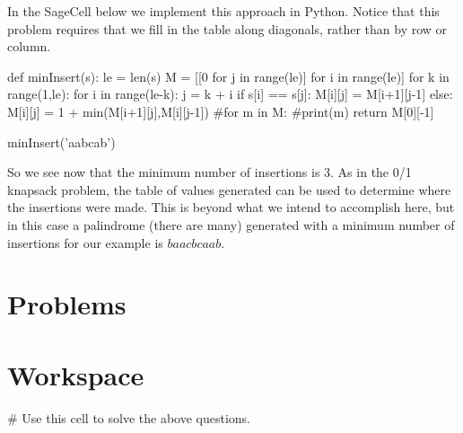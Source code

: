 \documentclass{ximera}
\begin{document}
In the SageCell below we implement this approach in Python. Notice that this problem requires that we fill in the table along diagonals, rather than by row or column.

\begin{sageCell}
def minInsert(s):
        le = len(s)
        M = [[0 for j in range(le)] for i in range(le)]
        for k in range(1,le):
                for i in range(le-k):
                        j = k + i
                        if s[i] == s[j]:
                                M[i][j] = M[i+1][j-1]
                        else:
                                M[i][j] = 1 + min(M[i+1][j],M[i][j-1])
        #for m in M:
                #print(m)
        return M[0][-1]

minInsert('aabcab')
\end{sageCell}

So we see now that the minimum number of insertions is 3. As in the 0/1 knapsack problem, the table of values generated can be used to determine where the insertions were made. This is beyond what we intend to accomplish here, but in this case a palindrome (there are many) generated with a minimum number of insertions for our example is $baacbcaab$.

\section{Problems}


\begin{question}
\end{question}

\section{Workspace}

\begin{sageCell}
# Use this cell to solve the above questions.
\end{sageCell}
\end{document}
